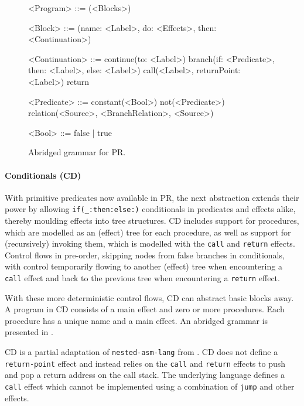 \documentclass[main.tex]{subfiles}
\begin{document}
\begin{figure}[ht]
	\begin{grammar}
		
		<Program> ::= (<Blocks>)
		
		<Block> ::= (name: <Label>, do: <Effects>, then: <Continuation>)
		
		<Continuation> ::= continue(to: <Label>)
			\alt branch(if: <Predicate>, then: <Label>, else: <Label>)
			\alt call(<Label>, returnPoint: <Label>)
			\alt return
			
		<Predicate> ::= constant(<Bool>)
			\alt not(<Predicate>)
			\alt relation(<Source>, <BranchRelation>, <Source>)
			
		<Bool> ::= false | true
		
	\end{grammar}
	\caption{Abridged grammar for PR.}
	\label{bnf:pr}
\end{figure}

\paragraph{Conditionals (CD)} With primitive predicates now available in PR, the next abstraction extends their power by allowing \texttt{if(_:then:else:)} conditionals in predicates and effects alike, thereby moulding effects into tree structures. CD includes support for procedures, which are modelled as an (effect) tree for each procedure, as well as support for (recursively) invoking them, which is modelled with the \texttt{call} and \texttt{return} effects. Control flows in pre-order, skipping nodes from false branches in conditionals, with control temporarily flowing to another (effect) tree when encountering a \texttt{call} effect and back to the previous tree when encountering a \texttt{return} effect.

With these more deterministic control flows, CD can abstract basic blocks away. A program in CD consists of a main effect and zero or more procedures. Each procedure has a unique name and a main effect. An abridged grammar is presented in .

CD is a partial adaptation of \texttt{nested-asm-lang} from \cite{:compcourse}. CD does not define a \texttt{return-point} effect and instead relies on the \texttt{call} and \texttt{return} effects to push and pop a return address on the call stack. The underlying language defines a \texttt{call} effect which cannot be implemented using a combination of \texttt{jump} and other effects.
\end{document}
